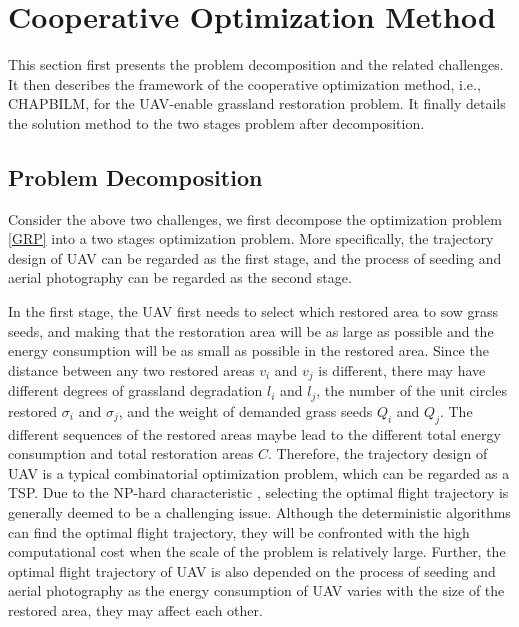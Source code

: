 \documentclass[preprint,5pt]{elsarticle}
\begin{document}
\section{Cooperative Optimization Method}\label{Cooperative-Optimization-Method} 
This section first presents the problem decomposition and the related challenges. It then describes the framework of the cooperative optimization method, i.e., CHAPBILM, for the UAV-enable grassland restoration problem. It finally details the solution method to the two stages problem after decomposition.
\subsection{Problem Decomposition} \label{Problem Decomposition}
Consider the above two challenges, we first decompose the optimization problem \eqref{GRP} into a two stages optimization problem. More specifically, the trajectory design of UAV can be regarded as the first stage, and the process of seeding and aerial photography can be regarded as the second stage.

In the first stage, the UAV first needs to select which restored area to sow grass seeds, and making that the restoration area will be as large as possible and the energy consumption will be as small as possible in the restored area. Since the distance between any two restored areas $v_i$ and $v_j$ is different, there may have different degrees of grassland degradation $l_i$ and $l_j$, the number of the unit circles restored $\sigma_i$ and $\sigma_j$, and the weight of demanded grass seeds $Q_i$ and $Q_j$. The different sequences of the restored areas maybe lead to the different total energy consumption and total restoration areas $C$. Therefore, the trajectory design of UAV is a typical combinatorial optimization problem, which can be regarded as a TSP. Due to the NP-hard characteristic \cite{chiang2019impact}, selecting the optimal flight trajectory is generally deemed to be a challenging issue. Although the deterministic algorithms can find the optimal flight trajectory, they will be confronted with the high computational cost when the scale of the problem is relatively large. Further, the optimal flight trajectory of UAV is also depended on the process of seeding and aerial photography as the energy consumption of UAV varies with the size of the restored area, they may affect each other.
\end{document}
